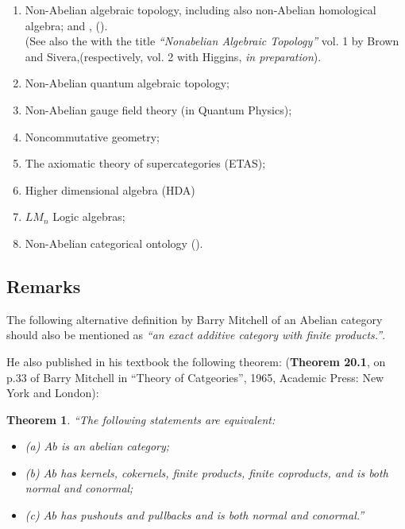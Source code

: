 \documentclass[12pt]{article}
\theoremstyle{plain}
\newtheorem{theorem}{Theorem}[section]
\theoremstyle{definition}
\numberwithin{equation}{section}
\begin{document}
\begin{enumerate}

\item Non-Abelian algebraic topology, including also non-Abelian homological algebra;
 and
, (\cite{RBetal2k7,RB2k8}).\\
(See also the  with the title {\em ``Nonabelian Algebraic Topology''} vol. 1 by Brown and Sivera,(respectively, vol. 2 with Higgins, \emph{in preparation}). 

\item Non-Abelian quantum algebraic topology;

\item Non-Abelian gauge field theory (in Quantum Physics);

\item Noncommutative geometry;

\item The axiomatic theory of supercategories (ETAS); 

\item Higher dimensional algebra (HDA)
\item $LM_n$ Logic algebras;

\item Non-Abelian categorical ontology (\cite{BBG2k7}). 

\end{enumerate}

\subsection{Remarks}
 The following alternative definition by Barry Mitchell of an Abelian category should also be mentioned as {\em ``an exact additive category with finite products.''}. 

 He also published in his textbook the following theorem:
(\textbf{Theorem 20.1}, on p.33 of Barry Mitchell in ``Theory of Catgeories'', 1965, Academic Press: 
New York and London): 

\begin{theorem} 
 ``{\em The following statements are equivalent}:
\begin{itemize}
\item (a) $Ab$ is an abelian category; 
\item (b) $Ab$ has kernels, cokernels, finite products, finite coproducts,
 and is both normal and conormal; 
\item (c) $Ab$ has pushouts and pullbacks and is both normal and conormal.''
\end{itemize}
\end{theorem}
\end{document}
